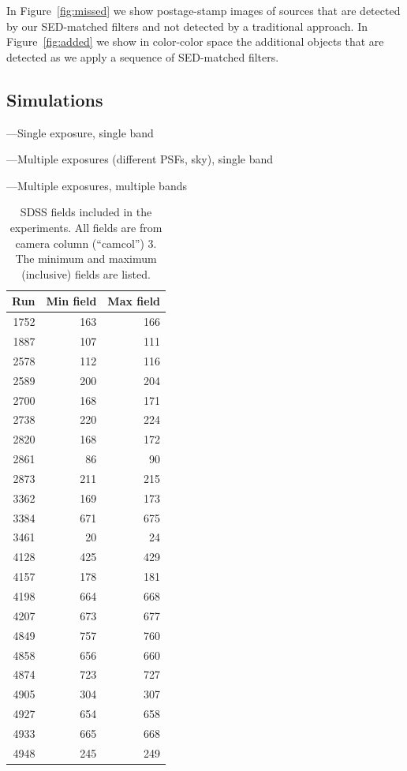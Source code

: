 \documentclass[letterpaper,preprint]{aastex}
\newcommand{\fig}{Figure}
\newcommand{\figref}[1]{\mbox{\fig~\ref{#1}}}
\begin{document}
In \figref{fig:missed} we show postage-stamp images of sources that
are detected by our SED-matched filters and not detected by a
traditional approach.  In \figref{fig:added} we show in color-color
space the additional objects that are detected as we apply a sequence
of SED-matched filters.



\subsection{Simulations}

---Single exposure, single band

---Multiple exposures (different PSFs, sky), single band

---Multiple exposures, multiple bands









\begin{table}
\begin{center}
\begin{tabular}{|r|r|r|}
\hline
Run & Min field & Max field \\
\hline
1752 & 163 & 166 \\
1887 & 107 & 111 \\
2578 & 112 & 116 \\
2589 & 200 & 204 \\
2700 & 168 & 171 \\
2738 & 220 & 224 \\
2820 & 168 & 172 \\
2861 & 86 & 90 \\
2873 & 211 & 215 \\
3362 & 169 & 173 \\
3384 & 671 & 675 \\
3461 & 20 & 24 \\
4128 & 425 & 429 \\
4157 & 178 & 181 \\
4198 & 664 & 668 \\
4207 & 673 & 677 \\
4849 & 757 & 760 \\
4858 & 656 & 660 \\
4874 & 723 & 727 \\
4905 & 304 & 307 \\
4927 & 654 & 658 \\
4933 & 665 & 668 \\
4948 & 245 & 249 \\
\hline
\end{tabular}
\caption{SDSS fields included in the experiments.  All fields are from
  camera column (``camcol'') 3.  The minimum and maximum (inclusive)
  fields are listed.\label{tab:fields}}
\end{center}
\end{table}
\end{document}
